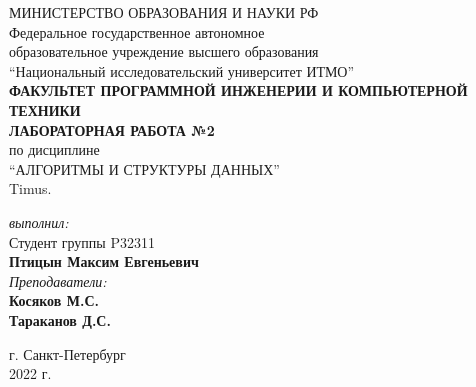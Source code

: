 \thispagestyle{empty}
\BgThispage
\begin{center}
	МИНИСТЕРСТВО ОБРАЗОВАНИЯ И НАУКИ РФ\\
	\hfill \break
	Федеральное государственное автономное\\
	образовательное учреждение высшего образования\\
	``Национальный исследовательский университет ИТМО''\\
	\hfill \break
	\textbf{ФАКУЛЬТЕТ ПРОГРАММНОЙ ИНЖЕНЕРИИ И КОМПЬЮТЕРНОЙ ТЕХНИКИ}\\
	\vspace{2cm}
	\large{\textbf{ЛАБОРАТОРНАЯ РАБОТА №2}}\\
	\hfill \break
	по дисциплине\\
	\large{``АЛГОРИТМЫ И СТРУКТУРЫ ДАННЫХ''}\\
	Timus.\\
	\hfill \break
	\vspace{3cm}
	\begin{flushright}
	\textit{выполнил:}\\
	Студент группы P32311\\
	\textbf{Птицын Максим Евгеньевич}\\
	\textit{Преподаватели:}\\
	\textbf{Косяков М.С.} \\
	\textbf{Тараканов Д.С.}
	\end{flushright}
\end{center}

\vfill

\begin{center} г. Санкт-Петербург\\2022 г.
\end{center}
\thispagestyle{empty}

\newpage
